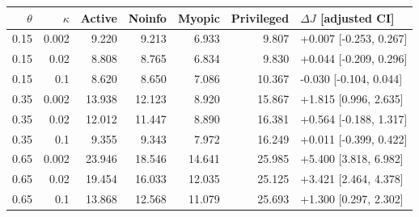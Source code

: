 \begin{center}\small\begin{tabular}{rrrrrrl}\toprule
$\theta$ & $\kappa$ & Active & Noinfo & Myopic & Privileged & $\Delta J$ [adjusted CI]\\\midrule
0.15 & 0.002 & 9.220 & 9.213 & 6.933 & 9.807 & +0.007 [-0.253, 0.267]\\
0.15 & 0.02 & 8.808 & 8.765 & 6.834 & 9.830 & +0.044 [-0.209, 0.296]\\
0.15 & 0.1 & 8.620 & 8.650 & 7.086 & 10.367 & -0.030 [-0.104, 0.044]\\
0.35 & 0.002 & 13.938 & 12.123 & 8.920 & 15.867 & +1.815 [0.996, 2.635]\\
0.35 & 0.02 & 12.012 & 11.447 & 8.890 & 16.381 & +0.564 [-0.188, 1.317]\\
0.35 & 0.1 & 9.355 & 9.343 & 7.972 & 16.249 & +0.011 [-0.399, 0.422]\\
0.65 & 0.002 & 23.946 & 18.546 & 14.641 & 25.985 & +5.400 [3.818, 6.982]\\
0.65 & 0.02 & 19.454 & 16.033 & 12.035 & 25.125 & +3.421 [2.464, 4.378]\\
0.65 & 0.1 & 13.868 & 12.568 & 11.079 & 25.693 & +1.300 [0.297, 2.302]\\
\bottomrule\end{tabular}\end{center}
